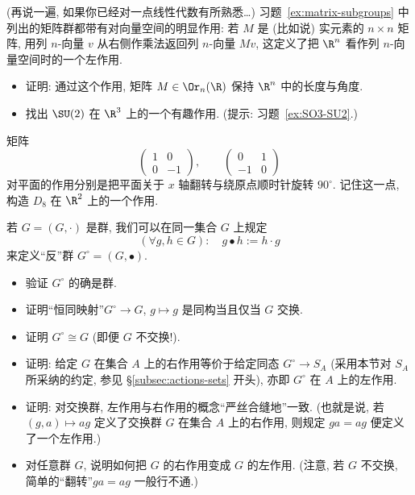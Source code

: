 \begin{prob}
\label{ex:matrix-actions}
(再说一遍, 如果你已经对一点线性代数有所熟悉\ldots) 习题~\ref{ex:matrix-subgroups} 中列出的矩阵群都带有对向量空间的明显作用: 若 $M$ 是 (比如说) 实元素的 $n \times n$ 矩阵, 用列 $n$-向量 $v$ 从右侧作乘法返回列 $n$-向量 $Mv$, 这定义了把 $\R^n$ 看作列 $n$-向量空间时的一个左作用.
\begin{itemize}
	\item 证明: 通过这个作用, 矩阵 $M \in \Or_n(\R)$ 保持 $\R^n$ 中的长度与角度.
	\item 找出 $\SU(2)$ 在 $\R^3$ 上的一个有趣作用. (提示: 习题~\ref{ex:SO3-SU2}.)
\end{itemize}
\end{prob}

\begin{prob}
\label{ex:D8-on-plane}
矩阵
\[
\begin{pmatrix} 1 & 0 \\ 0 & -1 \end{pmatrix}, \qquad \begin{pmatrix} 0 & 1 \\ -1 & 0 \end{pmatrix}
\]
对平面的作用分别是把平面关于 $x$ 轴翻转与绕原点顺时针旋转 $90^{\circ}$. 记住这一点, 构造 $D_8$ 在 $\R^2$ 上的一个作用.
\end{prob}

\begin{prob}
\label{ex:opposite-group}
若 $G = (G, \cdot)$ 是群, 我们可以在同一集合 $G$ 上规定
\[
(\forall g, h \in G): \quad g \bullet h := h \cdot g
\]
来定义``反''群 $G^{\circ} = (G, \bullet)$.
\begin{itemize}
	\item 验证 $G^{\circ}$ 的确是群.
	\item 证明``恒同映射''$G^{\circ} \rightarrow G$, $g \mapsto g$ 是同构当且仅当 $G$ 交换.
	\item 证明 $G^{\circ} \cong G$ (即便 $G$ 不交换!).
	\item 证明: 给定 $G$ 在集合 $A$ 上的右作用等价于给定同态 $G^{\circ} \to S_A$ (采用本节对 $S_A$ 所采纳的约定, 参见 \S\ref{subsec:actions-sets} 开头), 亦即 $G^{\circ}$ 在 $A$ 上的左作用.
	\item 证明: 对交换群, 左作用与右作用的概念``严丝合缝地''一致. (也就是说, 若 $(g, a) \mapsto ag$ 定义了交换群 $G$ 在集合 $A$ 上的右作用, 则规定 $ga = ag$ 便定义了一个左作用.)
	\item 对任意群 $G$, 说明如何把 $G$ 的右作用变成 $G$ 的左作用. (注意, 若 $G$ 不交换, 简单的``翻转''$ga = ag$ 一般行不通.)
\end{itemize}
\end{prob}

